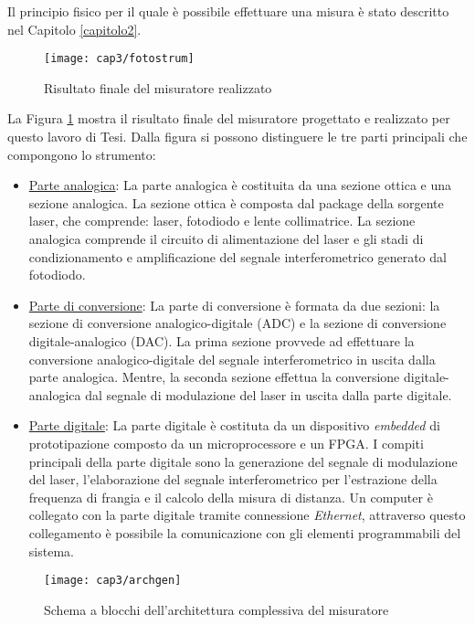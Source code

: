 Il principio fisico per il quale è possibile effettuare una misura è stato descritto nel Capitolo \ref{capitolo2}.
\begin{figure}[H]  
  \begin{center}
    \texttt{[image: cap3/fotostrum]}
    \caption{Risultato finale del misuratore realizzato}
    \label{fotorisfin}
  \end{center}
\end{figure}
La Figura \ref{fotorisfin} mostra il risultato finale del misuratore progettato e realizzato per questo lavoro di Tesi. Dalla figura si possono distinguere le tre parti principali che compongono lo strumento:
\begin{itemize}
	\item \underline{Parte analogica}: La parte analogica è costituita da una sezione ottica e una sezione analogica. La sezione ottica è composta dal package della sorgente laser, che comprende: laser, fotodiodo e lente collimatrice. La sezione analogica comprende il circuito di alimentazione del laser e gli stadi di condizionamento e amplificazione del segnale interferometrico generato dal fotodiodo.
	\item \underline{Parte di conversione}: La parte di conversione è formata da due sezioni: la sezione di conversione analogico-digitale (ADC) e la sezione di conversione digitale-analogico (DAC). La prima sezione provvede ad effettuare la conversione analogico-digitale del segnale interferometrico in uscita dalla parte analogica. Mentre, la seconda sezione effettua la conversione digitale-analogica dal segnale di modulazione del laser in uscita dalla parte digitale.
	\item \underline{Parte digitale}: La parte digitale è costituta da un dispositivo \textit{embedded} di prototipazione composto da un microprocessore e un FPGA. I compiti principali della parte digitale sono la generazione del segnale di modulazione del laser, l'elaborazione del segnale interferometrico per l'estrazione della frequenza di frangia e il calcolo della misura di distanza. Un computer è collegato con la parte digitale tramite connessione \textit{Ethernet}, attraverso questo collegamento è possibile la comunicazione con gli elementi programmabili del sistema.
\end{itemize}
\begin{figure}
  \begin{center}
    \texttt{[image: cap3/archgen]}
    \caption{Schema a blocchi dell'architettura complessiva del misuratore}
    \label{archgen}
  \end{center}
\end{figure}

